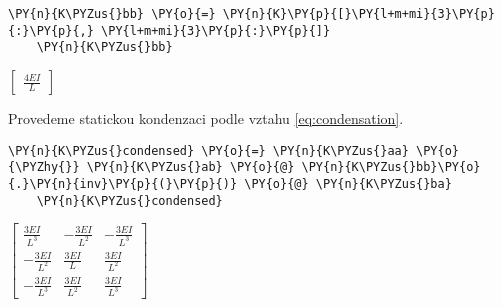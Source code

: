         
    
\begin{tcolorbox}[breakable, size=fbox, boxrule=1pt, pad at break*=1mm,colback=cellbackground, colframe=cellborder]
    \begin{Verbatim}[commandchars=\\\{\}]
    \PY{n}{K\PYZus{}bb} \PY{o}{=} \PY{n}{K}\PY{p}{[}\PY{l+m+mi}{3}\PY{p}{:}\PY{p}{,} \PY{l+m+mi}{3}\PY{p}{:}\PY{p}{]}
    \PY{n}{K\PYZus{}bb}
    \end{Verbatim}
\end{tcolorbox}
     
                
    
    $\displaystyle \left[\begin{matrix}\frac{4 E I}{L}\end{matrix}\right]$

\vspace{0.3cm}
Provedeme statickou kondenzaci podle vztahu \ref{eq:condensation}.    
\begin{tcolorbox}[breakable, size=fbox, boxrule=1pt, pad at break*=1mm,colback=cellbackground, colframe=cellborder]
    \begin{Verbatim}[commandchars=\\\{\}]
    \PY{n}{K\PYZus{}condensed} \PY{o}{=} \PY{n}{K\PYZus{}aa} \PY{o}{\PYZhy{}} \PY{n}{K\PYZus{}ab} \PY{o}{@} \PY{n}{K\PYZus{}bb}\PY{o}{.}\PY{n}{inv}\PY{p}{(}\PY{p}{)} \PY{o}{@} \PY{n}{K\PYZus{}ba}
    \PY{n}{K\PYZus{}condensed}
    \end{Verbatim}
\end{tcolorbox}
     
                
    
    $\displaystyle \left[\begin{matrix}\frac{3 E I}{L^{3}} & - \frac{3 E I}{L^{2}} & - \frac{3 E I}{L^{3}}\\- \frac{3 E I}{L^{2}} & \frac{3 E I}{L} & \frac{3 E I}{L^{2}}\\- \frac{3 E I}{L^{3}} & \frac{3 E I}{L^{2}} & \frac{3 E I}{L^{3}}\end{matrix}\right]$